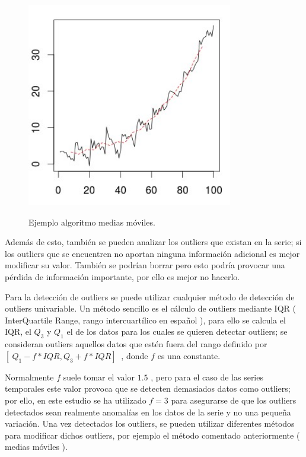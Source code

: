 \begin{figure}[h]
	\centering
	\includegraphics[width=90mm]{imagenes/moving_averages.png}
	\label{fig:51}
	\caption{Ejemplo algoritmo medias móviles.}
\end{figure}

Además de esto, también se pueden analizar los outliers que existan en la serie; si los outliers que se encuentren no aportan ninguna información adicional es mejor modificar su valor. También se podrían borrar pero esto podría provocar una pérdida de información importante, por ello es mejor no hacerlo.\newline

Para la detección de outliers se puede utilizar cualquier método de detección de outliers univariable. Un método sencillo es el cálculo de outliers mediante IQR ( InterQuartile Range, rango intercuartílico en español ), para ello se calcula el IQR, el $Q_3$ y $Q_1$ el  de los datos para los cuales se quieren detectar outliers; se consideran outliers aquellos datos que estén fuera del rango definido por $[\ Q_1 - f*IQR, Q_3+f*IQR ]\ $ , donde $f$ es una constante.\newline

Normalmente $f$ suele tomar el valor $1.5$ , pero para el caso de las series temporales este valor provoca que se detecten demasiados datos como outliers; por ello, en este estudio se ha utilizado $f=3$ para asegurarse de que los outliers detectados sean realmente anomalías en los datos de la serie y no una pequeña variación. Una vez detectados los outliers, se pueden utilizar diferentes métodos para modificar dichos outliers, por ejemplo el método comentado anteriormente ( medias móviles ).\newline

